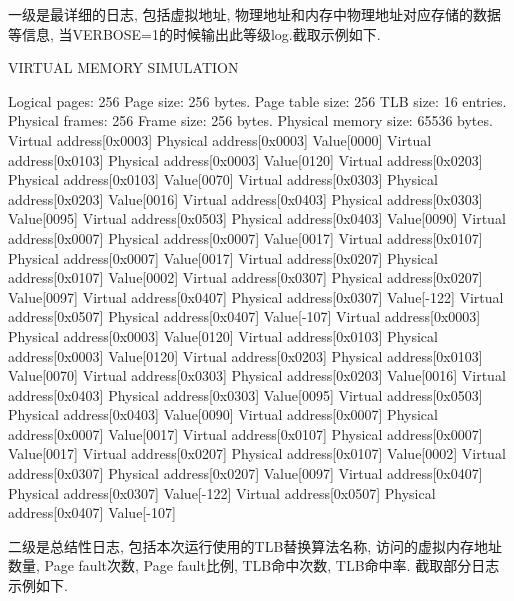 一级是最详细的日志, 包括虚拟地址, 物理地址和内存中物理地址对应存储的数据等信息,
当VERBOSE=1的时候输出此等级log.截取示例如下.\par
\begin{code}
    VIRTUAL MEMORY SIMULATION

    Logical pages: 256
    Page size: 256 bytes.
    Page table size: 256
    TLB size: 16 entries.
    Physical frames: 256
    Frame size: 256 bytes.
    Physical memory size: 65536 bytes.
    Virtual address[0x0003]         Physical address[0x0003]        Value[0000]
    Virtual address[0x0103]         Physical address[0x0003]        Value[0120]
    Virtual address[0x0203]         Physical address[0x0103]        Value[0070]
    Virtual address[0x0303]         Physical address[0x0203]        Value[0016]
    Virtual address[0x0403]         Physical address[0x0303]        Value[0095]
    Virtual address[0x0503]         Physical address[0x0403]        Value[0090]
    Virtual address[0x0007]         Physical address[0x0007]        Value[0017]
    Virtual address[0x0107]         Physical address[0x0007]        Value[0017]
    Virtual address[0x0207]         Physical address[0x0107]        Value[0002]
    Virtual address[0x0307]         Physical address[0x0207]        Value[0097]
    Virtual address[0x0407]         Physical address[0x0307]        Value[-122]
    Virtual address[0x0507]         Physical address[0x0407]        Value[-107]
    Virtual address[0x0003]         Physical address[0x0003]        Value[0120]
    Virtual address[0x0103]         Physical address[0x0003]        Value[0120]
    Virtual address[0x0203]         Physical address[0x0103]        Value[0070]
    Virtual address[0x0303]         Physical address[0x0203]        Value[0016]
    Virtual address[0x0403]         Physical address[0x0303]        Value[0095]
    Virtual address[0x0503]         Physical address[0x0403]        Value[0090]
    Virtual address[0x0007]         Physical address[0x0007]        Value[0017]
    Virtual address[0x0107]         Physical address[0x0007]        Value[0017]
    Virtual address[0x0207]         Physical address[0x0107]        Value[0002]
    Virtual address[0x0307]         Physical address[0x0207]        Value[0097]
    Virtual address[0x0407]         Physical address[0x0307]        Value[-122]
    Virtual address[0x0507]         Physical address[0x0407]        Value[-107]

\end{code}

二级是总结性日志, 包括本次运行使用的TLB替换算法名称, 访问的虚拟内存地址数量,
Page fault次数, Page fault比例, TLB命中次数, TLB命中率. 截取部分日志示例如下.\par

